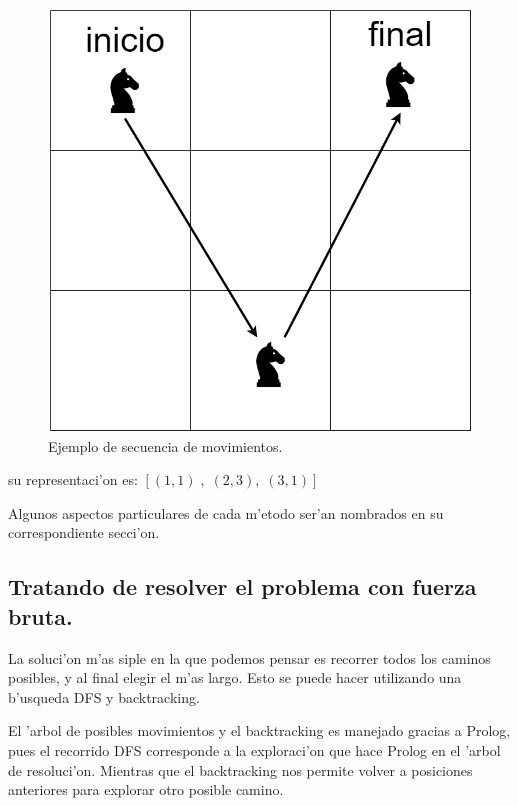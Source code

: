 \documentclass[12pt]{article}
\begin{document}
\begin{itemize}
        \begin{figure}[H]
            \centering
            \includegraphics[scale=0.22]{recorrido1.png}
            \caption{Ejemplo de secuencia de movimientos.}
            \label{fig:recorrido1}
        \end{figure}


        su representaci'on es: $[ (1,1) \; ,\; (2,3),\; (3,1) ]$

    \end{itemize}

    Algunos aspectos particulares de cada m'etodo ser'an nombrados
    en su correspondiente secci'on.


    \subsection{Tratando de resolver el problema con fuerza
    bruta.}

    La soluci'on m'as siple en la que podemos pensar es recorrer todos los caminos posibles, y al final elegir
    el m'as largo. Esto se puede hacer utilizando una b'usqueda DFS y backtracking.


    El 'arbol de posibles movimientos y el backtracking es manejado
    gracias a Prolog, pues el recorrido DFS corresponde
    a la exploraci'on que hace Prolog en el 'arbol de resoluci'on. Mientras que el backtracking nos permite volver a posiciones anteriores
    para explorar otro posible camino.
\end{document}
